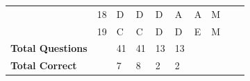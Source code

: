 \documentclass[pageno]{jpaper}
\begin{document}
\begin{table}[]
\begin{tabularx}{\textwidth}{XXXXXXXXXX}
\textbf{}                & 18              & D                       & D                      & D                       & A                       & A                       & M                   \\
\textbf{}                & 19              & C                       & C                      & D                       & D                       & E                       & M                   \\ \midrule
\textbf{Total Questions} &                 & 41                      & 41                     & 13                      & 13                      &                         &                     \\
\textbf{Total Correct}   &                 & 7                       & 8                      & 2                       & 2                       &                         &                     \\ \bottomrule
\end{tabularx}
\end{table}
\end{document}
